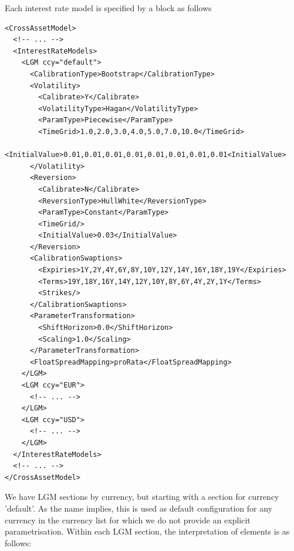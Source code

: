 \medskip

Each interest rate model is specified by a block as follows

\begin{listing}[H]
\begin{verbatim}
<CrossAssetModel>
  <!-- ... -->
  <InterestRateModels>
    <LGM ccy="default">
      <CalibrationType>Bootstrap</CalibrationType>
      <Volatility>
        <Calibrate>Y</Calibrate>
        <VolatilityType>Hagan</VolatilityType>
        <ParamType>Piecewise</ParamType>
        <TimeGrid>1.0,2.0,3.0,4.0,5.0,7.0,10.0</TimeGrid>
        <InitialValue>0.01,0.01,0.01,0.01,0.01,0.01,0.01,0.01<InitialValue>
      </Volatility>
      <Reversion>
        <Calibrate>N</Calibrate>
        <ReversionType>HullWhite</ReversionType>
        <ParamType>Constant</ParamType>
        <TimeGrid/>
        <InitialValue>0.03</InitialValue>
      </Reversion>
      <CalibrationSwaptions>
        <Expiries>1Y,2Y,4Y,6Y,8Y,10Y,12Y,14Y,16Y,18Y,19Y</Expiries>
        <Terms>19Y,18Y,16Y,14Y,12Y,10Y,8Y,6Y,4Y,2Y,1Y</Terms>
        <Strikes/>
      </CalibrationSwaptions>
      <ParameterTransformation>
        <ShiftHorizon>0.0</ShiftHorizon>
        <Scaling>1.0</Scaling>
      </ParameterTransformation>
      <FloatSpreadMapping>proRata</FloatSpreadMapping>
    </LGM>
    <LGM ccy="EUR">
      <!-- ... -->
    </LGM>
    <LGM ccy="USD">
      <!-- ... -->
    </LGM>
  </InterestRateModels>
  <!-- ... -->
</CrossAssetModel>
\end{verbatim}
\caption{Simulation model IR configuration}
\label{lst:simulation_model_ir_configuration}
\end{listing}

We have LGM sections by currency, but starting with a section for currency 'default'. As the name implies, this is used
as default configuration for any currency in the currency list for which we do not provide an explicit
parametrisation. Within each LGM section, the interpretation of elements is as follows:

